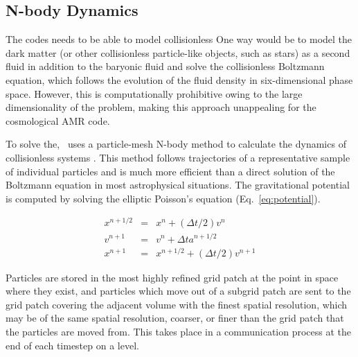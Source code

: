 \subsection{N-body Dynamics}
\label{sec.ov.nbody}

The codes needs to be able to model collisionless 
One way would be to model the dark matter (or other collisionless particle-like objects, such as stars) as a second fluid in addition to the baryonic fluid and solve the collisionless Boltzmann equation, which follows the evolution of the fluid density in six-dimensional phase space.  However, this is computationally prohibitive owing to the large dimensionality of the problem, making this approach  unappealing for the cosmological AMR code.

To solve the, \enzo\ uses a particle-mesh N-body method to calculate 
the dynamics of collisionless systems \citep{Hockney88}.  This method 
follows trajectories 
of a representative sample of individual particles and is much more 
efficient than a direct solution of the Boltzmann equation in most 
astrophysical situations. 
The gravitational potential is computed by solving the elliptic 
Poisson's equation (Eq.~\ref{eq:potential}).

\begin{eqnarray}
\label{eqn.driftkick}
x^{n+1/2} & = & x^n + (\Delta t/2) v^{n} \nonumber \\
v^{n+1} & = & v^n + \Delta t a^{n+1/2} \\
x^{n+1} & = & x^{n+1/2} + (\Delta t/2) v^{n+1} \nonumber
\end{eqnarray}



Particles are stored in the most highly refined grid patch at the point in space where they exist, and particles which move out of a subgrid patch are sent to the grid patch covering the adjacent volume with the finest spatial resolution, which may be of the same spatial resolution, coarser, or finer than the grid patch that the particles are moved from.  This takes place in a communication process at the end of each timestep on a level.

